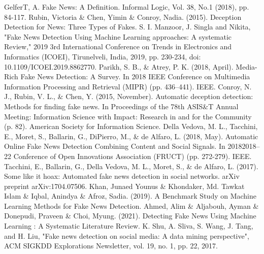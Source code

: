 
\begin{thebibliography}{3}
 GelferT, A. Fake News: A Definition.
    Informal Logic, Vol. 38, No.1 (2018), pp. 84-117.
 Rubin, Victoria \& Chen, Yimin \& Conroy, Nadia. (2015).
    Deception Detection for News: Three Types of Fakes.
 S. I. Manzoor, J. Singla and Nikita, "Fake News Detection Using Machine Learning approaches: A systematic Review," 2019 3rd International Conference on Trends in Electronics and Informatics (ICOEI), Tirunelveli, India, 2019, pp.
    230-234, doi: 10.1109/ICOEI.2019.8862770.
 Parikh, S. B., \& Atrey, P. K. (2018, April).
    Media-Rich Fake News Detection: A Survey.
    In 2018 IEEE Conference on Multimedia Information Processing and Retrieval (MIPR) (pp. 436--441).
    IEEE\@.
 Conroy, N. J., Rubin, V. L., \& Chen, Y. (2015, November).
    Automatic deception detection: Methods for finding fake news.
    In Proceedings of the 78th ASIS\&T Annual Meeting: Information Science with Impact: Research in and for the Community (p. 82).
    American Society for Information Science.
 Della Vedova, M. L., Tacchini, E., Moret, S., Ballarin, G., DiPierro, M., \& de Alfaro, L. (2018, May).
    Automatic Online Fake News Detection Combining Content and Social Signals.
    In 20182018--22   Conference of Open Innovations Association (FRUCT) (pp. 272-279).
    IEEE.
 Tacchini, E., Ballarin, G., Della Vedova, M. L., Moret, S., \& de Alfaro, L. (2017).
    Some like it hoax: Automated fake news detection in social networks.
    arXiv preprint arXiv:1704.07506.
 Khan, Junaed Younus \& Khondaker, Md. Tawkat Islam \& Iqbal, Anindya \& Afroz, Sadia. (2019).
    A Benchmark Study on Machine Learning Methods for Fake News Detection.
 Ahmed, Alim \& Aljabouh, Ayman \& Donepudi, Praveen \& Choi, Myung. (2021).
    Detecting Fake News Using Machine Learning : A Systematic Literature Review.
 K. Shu, A. Sliva, S. Wang, J. Tang, and H. Liu, "Fake news detection on social media: A data mining perspective", ACM SIGKDD Explorations Newsletter, vol.
    19, no. 1, pp. 22, 2017.
\end{thebibliography}
